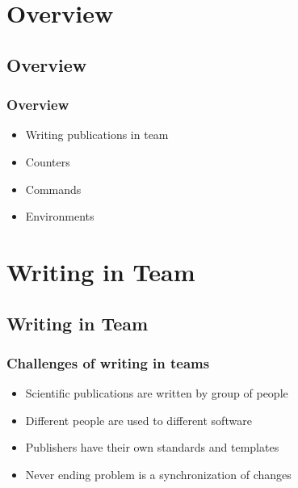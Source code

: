 \section[Overview]{Overview}
\subsection[Overview]{Overview}

\begin{frame}  \frametitle{Overview}
	\begin{itemize}
		\item Writing publications in team
		\item Counters
		\item Commands
		\item Environments
	\end{itemize}
\end{frame}

\section[Writing in Team]{Writing in Team}
\subsection[Writing in Team]{Writing in Team}

\begin{frame}  \frametitle{Challenges of writing in teams}

	\begin{itemize}	
		\item Scientific publications are written by group of people
		\item Different people are used to different software
		\item Publishers have their own standards and templates
		\item Never ending problem is a synchronization of changes
	\end{itemize}
\end{frame}


